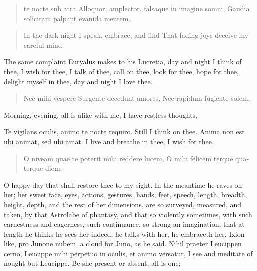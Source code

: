 \begin{latin}
\begin{verse}
te nocte sub atra
Alloquor, amplector, falsaque in imagine somni,
Gaudia solicitam palpant evanida mentem.
\end{verse}
\end{latin}
\translationrule%
\begin{verse}%
In the dark night I speak, embrace, and find
That fading joys deceive my careful mind.
\end{verse}%

The same complaint Euryalus makes to his Lucretia, day and night
I think of thee, I wish for thee, I talk of thee, call on thee, look
for thee, hope for thee, delight myself in thee, day and night I love
thee.

\begin{latin}
\begin{verse}
Nec mihi vespere
Surgente decedunt amores,
Nec rapidum fugiente solem.
\end{verse}
\end{latin}

Morning, evening, all is alike with me, I have restless thoughts,

 Te vigilans oculis, animo te nocte requiro. Still I think on
thee. Anima non est ubi animat, sed ubi amat. I live and breathe in
thee, I wish for thee.

\begin{latin}
\begin{verse}
O niveam quae te poterit mihi reddere lucem,
O mihi felicem terque quaterque diem.
\end{verse}
\end{latin}

O happy day that shall restore thee to my sight. In the meantime he
raves on her; her sweet face, eyes, actions, gestures, hands, feet,
speech, length, breadth, height, depth, and the rest of her dimensions,
are so surveyed, measured, and taken, by that Astrolabe of phantasy,
and that so violently sometimes, with such earnestness and eagerness,
such continuance, so strong an imagination, that at length he thinks he
sees her indeed; he talks with her, he embraceth her, Ixion-like, pro
Junone nubem, a cloud for Juno, as he said. Nihil praeter Leucippen
cerno, Leucippe mihi perpetuo in oculis, et animo versatur, I see and
meditate of nought but Leucippe. Be she present or absent, all is one;

